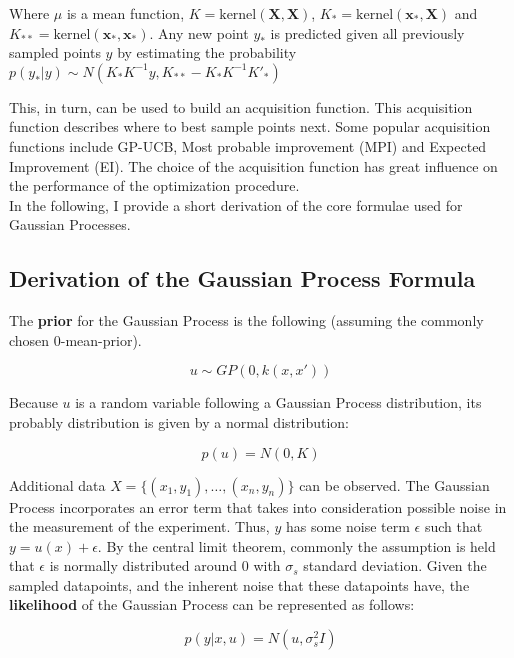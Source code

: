 Where $\mu$ is a mean function, $K = \text{kernel}(\mathbf{X}, \mathbf{X})$, $K_* = \text{kernel}(\mathbf{x_*}, \mathbf{X})$ and $K_{**} = \text{kernel}(\mathbf{x_*}, \mathbf{x_*})$.
Any new point $y_*$ is predicted given all previously sampled points $y$ by estimating the probability $ p(y_*|y) \sim N(K_*K^{-1}y,K_{**}-K_*K^{-1}K'_*) $

This, in turn, can be used to build an acquisition function. 
This acquisition function describes where to best sample points next.
Some popular acquisition functions include GP-UCB, Most probable improvement (MPI) and Expected Improvement (EI).
The choice of the acquisition function has great influence on the performance of the optimization procedure.\\

In the following, I provide a short derivation of the core formulae used for Gaussian Processes.

\subsection{Derivation of the Gaussian Process Formula}
The \textbf{prior} for the Gaussian Process is the following (assuming the commonly chosen 0-mean-prior).

\begin{equation}
u \sim GP(0, k(x, x'))
\end{equation}

Because $u$ is a random variable following a Gaussian Process distribution, its probably distribution is given by a normal distribution:

\begin{equation}
p(u) = N ( 0, K )
\end{equation}

Additional data $ X = \{ (x_1, y_1), \ldots, (x_n, y_n) \} $ can be observed.
The Gaussian Process incorporates an error term that takes into consideration possible noise in the measurement of the experiment.
Thus, $y$ has some noise term $\epsilon$ such that $y = u(x) + \epsilon$.
By the central limit theorem, commonly the assumption is held that $\epsilon$ is normally distributed around $0$ with $\sigma_s$ standard deviation.
Given the sampled datapoints, and the inherent noise that these datapoints have, the \textbf{likelihood} of the Gaussian Process can be represented as follows:

\begin{equation}
p(y | x, u) = N (u, \sigma_s^2 I)
\end{equation}

